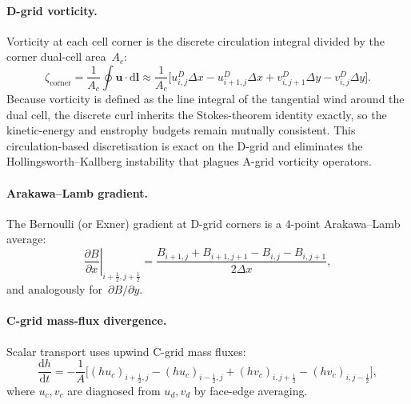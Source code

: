 \documentclass[11pt,a4paper]{article}
\newcommand{\dd}{\mathrm{d}}
\newcommand{\pp}{\partial}
\newcommand{\half}{\tfrac{1}{2}}
\begin{document}
\paragraph{D-grid vorticity.}
Vorticity at each cell corner is the discrete circulation integral divided by the corner dual-cell area~$A_c$:
\begin{equation}
  \zeta_{\mathrm{corner}} = \frac{1}{A_c}\oint \bm{u}\cdot\dd\bm{l}
  \approx \frac{1}{A_c}\bigl[u^D_{i,j}\Delta x - u^D_{i+1,j}\Delta x + v^D_{i,j+1}\Delta y - v^D_{i,j}\Delta y\bigr].
\end{equation}
Because vorticity is defined as the line integral of the tangential wind around the dual cell, the discrete curl inherits the Stokes-theorem identity exactly, so the kinetic-energy and enstrophy budgets remain mutually consistent.  This circulation-based discretisation is exact on the D-grid and eliminates the Hollingsworth--Kallberg instability that plagues A-grid vorticity operators.

\paragraph{Arakawa--Lamb gradient.}
The Bernoulli (or Exner) gradient at D-grid corners is a 4-point Arakawa--Lamb average:
\begin{equation}
  \left.\frac{\pp B}{\pp x}\right|_{i+\half,j+\half}
  = \frac{B_{i+1,j}+B_{i+1,j+1}-B_{i,j}-B_{i,j+1}}{2\Delta x},
\end{equation}
and analogously for~$\pp B/\pp y$.

\paragraph{C-grid mass-flux divergence.}
Scalar transport uses upwind C-grid mass fluxes:
\begin{equation}
  \frac{\dd h}{\dd t} = -\frac{1}{A}\bigl[(h u_c)_{i+\half,j}-(h u_c)_{i-\half,j}+(h v_c)_{i,j+\half}-(h v_c)_{i,j-\half}\bigr],
\end{equation}
where $u_c,v_c$ are diagnosed from $u_d,v_d$ by face-edge averaging.
\end{document}
